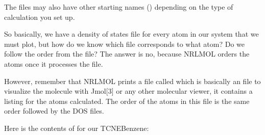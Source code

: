 \documentclass[letterpaper,10pt,english,openany,oneside]{sphinxmanual}
\begin{document}
\sphinxAtStartPar
The files may also have other starting names () depending on the type of calculation you set up.

\sphinxAtStartPar
So basically, we have a density of states file for every atom in our system that we must plot, but how do we know which file corresponds to what atom? Do we follow the order from the  file? The answer is no, because NRLMOL orders the atoms once it processes the  file.

\sphinxAtStartPar
However, remember that NRLMOL prints a file called  which is basically an  file to visualize the molecule with Jmol{[}3{]} or any other molecular viewer, it contains a listing for the atoms calculated. The order of the atoms in this file is the same order followed by the DOS files.

\sphinxAtStartPar
Here is the contents of  for our TCNE\sphinxhyphen{}Benzene:
\end{document}
